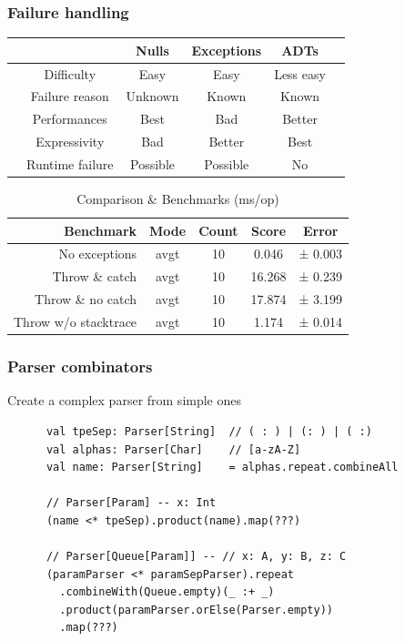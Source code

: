 \begin{frame}
  \frametitle{Failure handling}

  \begin{table}[h]
    \centering
    \begin{tabular}{cccccc}
      \toprule
       &                 & \textbf{Null}s & \textbf{Exception}s & \textbf{ADT}s & \\
      \midrule
       & Difficulty      & Easy           & Easy                & Less easy     & \\
       & Failure reason  & Unknown        & Known               & Known         & \\
       & Performances    & Best           & Bad                 & Better        & \\
       & Expressivity    & Bad            & Better              & Best          & \\
       & Runtime failure & Possible       & Possible            & No            & \\
    \end{tabular}
  \end{table}

  \begin{table}[h]
    \centering
    \begin{tabular}{rcccc}
      \textbf{Benchmark}   & \textbf{Mode} & \textbf{Count} & \textbf{Score} & \textbf{Error} \\
      \midrule
      No exceptions        & avgt          & 10             & 0.046          & ± 0.003        \\
      Throw \& catch       & avgt          & 10             & 16.268         & ± 0.239        \\
      Throw \& no catch    & avgt          & 10             & 17.874         & ± 3.199        \\
      Throw w/o stacktrace & avgt          & 10             & 1.174          & ± 0.014        \\
      \bottomrule
    \end{tabular}
    \caption{Comparison \& Benchmarks (ms/op)}
  \end{table}
\end{frame}

\begin{frame}[fragile]
  \frametitle{Parser combinators}

  Create a complex parser from simple ones

  \begin{example}
    \begin{lstlisting}
      val tpeSep: Parser[String]  // ( : ) | (: ) | ( :)
      val alphas: Parser[Char]    // [a-zA-Z]
      val name: Parser[String]    = alphas.repeat.combineAll

      // Parser[Param] -- x: Int
      (name <* tpeSep).product(name).map(???)

      // Parser[Queue[Param]] -- // x: A, y: B, z: C
      (paramParser <* paramSepParser).repeat
        .combineWith(Queue.empty)(_ :+ _)
        .product(paramParser.orElse(Parser.empty))
        .map(???)
    \end{lstlisting}
  \end{example}
\end{frame}

